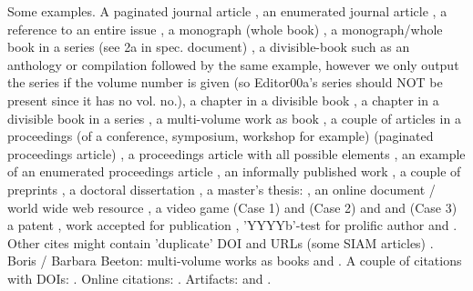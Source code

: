 \documentclass[manuscript,screen,review]{acmart}
\begin{document}
  Some examples.  A paginated journal article \cite{Abril07}, an
  enumerated journal article \cite{Cohen07}, a reference to an entire
  issue \cite{JCohen96}, a monograph (whole book) \cite{Kosiur01}, a
  monograph/whole book in a series (see 2a in spec. document)
  \cite{Harel79}, a divisible-book such as an anthology or compilation
  \cite{Editor00} followed by the same example, however we only output
  the series if the volume number is given \cite{Editor00a} (so
  Editor00a's series should NOT be present since it has no vol. no.),
  a chapter in a divisible book \cite{Spector90}, a chapter in a
  divisible book in a series \cite{Douglass98}, a multi-volume work as
  book \cite{Knuth97}, a couple of articles in a proceedings (of a
  conference, symposium, workshop for example) (paginated proceedings
  article) \cite{Andler79, Hagerup1993}, a proceedings article with
  all possible elements \cite{Smith10}, an example of an enumerated
  proceedings article \cite{VanGundy07}, an informally published work
  \cite{Harel78}, a couple of preprints \cite{Bornmann2019,
    AnzarootPBM14}, a doctoral dissertation \cite{Clarkson85}, a
  master's thesis: \cite{anisi03}, an online document / world wide web
  resource \cite{Thornburg01, Ablamowicz07, Poker06}, a video game
  (Case 1) \cite{Obama08} and (Case 2) \cite{Novak03} and \cite{Lee05}
  and (Case 3) a patent \cite{JoeScientist001}, work accepted for
  publication \cite{rous08}, 'YYYYb'-test for prolific author
  \cite{SaeediMEJ10} and \cite{SaeediJETC10}. Other cites might
  contain 'duplicate' DOI and URLs (some SIAM articles)
  \cite{Kirschmer:2010:AEI:1958016.1958018}. Boris / Barbara Beeton:
  multi-volume works as books \cite{MR781536} and \cite{MR781537}. A
  couple of citations with DOIs:
  \cite{2004:ITE:1009386.1010128,Kirschmer:2010:AEI:1958016.1958018}. Online
  citations: \cite{TUGInstmem, Thornburg01, CTANacmart}.
  Artifacts: \cite{R} and \cite{UMassCitations}.



\end{document}
